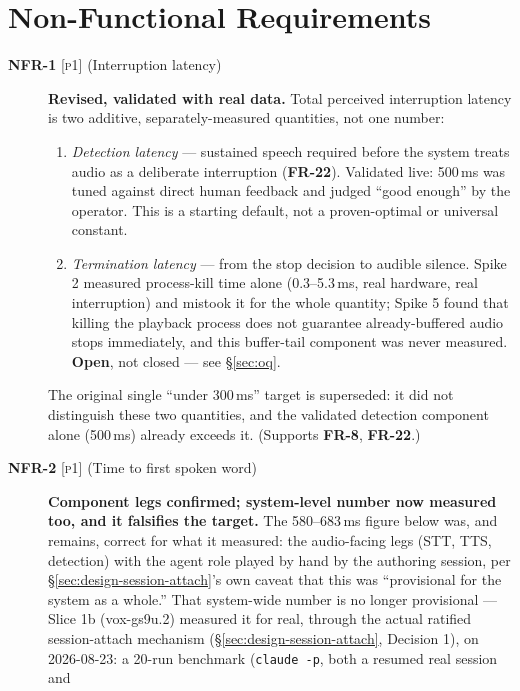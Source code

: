 \documentclass[a4paper,11pt]{report}
\newcommand{\fr}[1]{\textbf{FR-#1}}
\newcommand{\nfr}[1]{\textbf{NFR-#1}}
\newcommand{\pone}{\textsc{[p1]}}
\begin{document}
\section{Non-Functional Requirements}

\begin{description}
  \item[\nfr{1} \pone{} (Interruption latency)] \textbf{Revised, validated
    with real data.} Total perceived interruption latency is two
    additive, separately-measured quantities, not one number:
    \begin{enumerate}
      \item \emph{Detection latency} --- sustained speech required before
        the system treats audio as a deliberate interruption (\fr{22}).
        Validated live: 500\,ms was tuned against direct human feedback
        and judged ``good enough'' by the operator. This is a starting
        default, not a proven-optimal or universal constant.
      \item \emph{Termination latency} --- from the stop decision to
        audible silence. Spike 2 measured process-kill time alone
        (0.3--5.3\,ms, real hardware, real interruption) and mistook it
        for the whole quantity; Spike 5 found that killing the playback
        process does not guarantee already-buffered audio stops
        immediately, and this buffer-tail component was never measured.
        \textbf{Open}, not closed --- see \S\ref{sec:oq}.
    \end{enumerate}
    The original single ``under 300\,ms'' target is superseded: it did
    not distinguish these two quantities, and the validated detection
    component alone (500\,ms) already exceeds it. (Supports \fr{8},
    \fr{22}.)
  \item[\nfr{2} \pone{} (Time to first spoken word)] \textbf{Component
    legs confirmed; system-level number now measured too, and it
    falsifies the target.} The 580--683\,ms figure below was, and remains,
    correct for what it measured: the audio-facing legs (STT, TTS,
    detection) with the agent role played by hand by the authoring
    session, per \S\ref{sec:design-session-attach}'s own caveat that this
    was ``provisional for the system as a whole.'' That system-wide number
    is no longer provisional --- Slice 1b (vox-gs9u.2) measured it for
    real, through the actual ratified session-attach mechanism
    (\S\ref{sec:design-session-attach}, Decision 1), on 2026-08-23: a
    20-run benchmark (\texttt{claude -p}, both a resumed real session and

\end{description}
\end{document}
